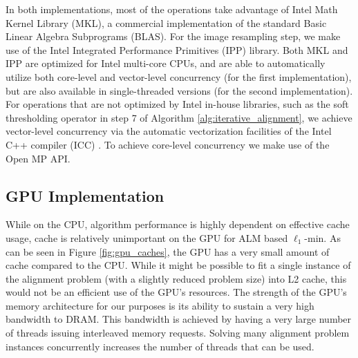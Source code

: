 \documentclass[preprint]{sigplanconf}
\begin{document}


In both implementations, most of the operations take
advantage of Intel Math Kernel Library (MKL), a commercial implementation of
the standard Basic Linear Algebra Subprograms (BLAS). For the image resampling
step, we make use of the Intel Integrated Performance Primitives (IPP) library.
Both MKL and IPP are optimized for Intel multi-core CPUs, and are able to
automatically utilize both core-level and vector-level concurrency (for the first implementation),
but are also available in single-threaded versions (for the second implementation). For 
operations that are not optimized by Intel in-house libraries, such as the soft thresholding
operator in step 7 of Algorithm \ref{alg:iterative_alignment}, we achieve 
vector-level concurrency via
the automatic vectorization facilities of the Intel C++ compiler (ICC) \cite{dulong1999overview}.
To achieve core-level concurrency we make use of the Open MP API. \cite{dagum2002openmp} 

\subsection{GPU Implementation} 
\label{sec:alignment_implementation_gpu}
While on the CPU, algorithm performance is highly dependent on effective
cache usage, cache is relatively unimportant on the GPU for ALM based
$\ell_1$-min.  As can be seen in Figure \ref{fig:gpu_caches}, the GPU has 
a very small amount of cache compared to the CPU.  While it might be possible
to fit a single instance of the alignment problem (with a slightly reduced problem size)
into L2 cache, this would not be an efficient use of the GPU's resources.
The strength of the GPU's memory architecture for our purposes is its ability to sustain a very
high bandwidth to DRAM.  This bandwidth is achieved by having a very large number of
threads issuing interleaved memory requests.  Solving many alignment problem instances
concurrently increases the number of threads that can be used.
\end{document}
